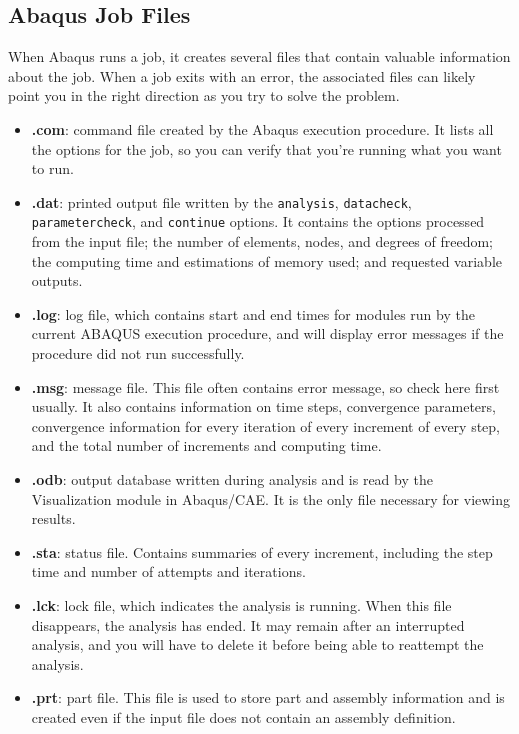 \documentclass[10pt,letterpaper,oneside]{report}
\begin{document}
\subsection{Abaqus Job Files}
When Abaqus runs a job, it creates several files that contain valuable information about the job.  When a job exits with an error, the associated files can likely point you in the right direction as you try to solve the problem.  
\begin{itemize}
\item \textbf{.com}: command file created by the Abaqus execution procedure.  It lists all the options for the job, so you can verify that you're running what you want to run.
\item \textbf{.dat}: printed output file written by the \texttt{analysis}, \texttt{datacheck}, \texttt{parametercheck}, and \texttt{continue} options.  It contains the options processed from the input file; the number of elements, nodes, and degrees of freedom; the computing time and estimations of memory used; and requested variable outputs.
\item \textbf{.log}: log file, which contains start and end times for modules run by the current ABAQUS execution procedure, and will display error messages if the procedure did not run successfully.
\item \textbf{.msg}: message file.  This file often contains error message, so check here first usually.  It also contains information on time steps, convergence parameters, convergence information for every iteration of every increment of every step, and the total number of increments and computing time.
\item \textbf{.odb}: output database written during analysis and is read by the Visualization module in Abaqus/CAE.  It is the only file necessary for viewing results.
\item \textbf{.sta}: status file.  Contains summaries of every increment, including the step time and number of attempts and iterations.
\item \textbf{.lck}: lock file, which indicates the analysis is running.  When this file disappears, the analysis has ended.  It may remain after an interrupted analysis, and you will have to delete it before being able to reattempt the analysis.
\item \textbf{.prt}:  part file.  This file is used to store part and assembly information and is created even if the input file does not contain an assembly definition.


\end{itemize}
\end{document}
